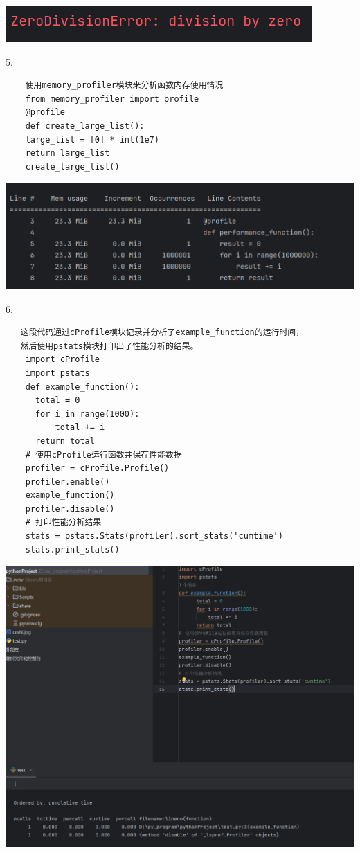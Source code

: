 \documentclass{article}
\begin{document}
\noindent
\begin{minipage}{\linewidth}
 \centering
  \includegraphics[width=0.5\linewidth]{trackback.png}
  \label{fig:example}
\end{minipage}

5.
\begin{verbatim}
	使用memory_profiler模块来分析函数内存使用情况
	from memory_profiler import profile
	@profile
	def create_large_list():
	large_list = [0] * int(1e7)
	return large_list
	create_large_list()
\end{verbatim}

\noindent
\begin{minipage}{\linewidth}
	\centering
	\includegraphics[width=0.5\linewidth]{memory.png}
	\label{fig:example}
\end{minipage}

6.
\begin{verbatim}
   这段代码通过cProfile模块记录并分析了example_function的运行时间，
   然后使用pstats模块打印出了性能分析的结果。
    import cProfile
    import pstats
    def example_function():
      total = 0
      for i in range(1000):
          total += i
      return total
    # 使用cProfile运行函数并保存性能数据
    profiler = cProfile.Profile()
    profiler.enable()
    example_function()
    profiler.disable()
    # 打印性能分析结果
    stats = pstats.Stats(profiler).sort_stats('cumtime')
    stats.print_stats()     
\end{verbatim}


\noindent
\begin{minipage}{\linewidth}
 \centering
  \includegraphics[width=0.5\linewidth]{cprofile.png}
  \label{fig:example}
\end{minipage}
\end{document}
